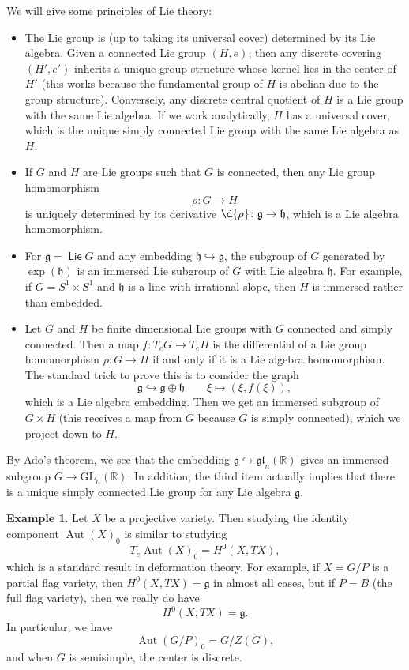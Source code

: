 \documentclass{amsart}
\theoremstyle{definition}
\newtheorem{exm}[thm]{Example}
\theoremstyle{remark}
\theoremstyle{plain}
\theoremstyle{definition}
\theoremstyle{remark}
\newcommand{\R}{\mathbb{R}}
\newcommand{\g}{\mathfrak{g}}
\newcommand{\h}{\mathfrak{h}}
\newcommand{\mf}[1]{\mathfrak{#1}}
\newcommand{\mr}[1]{\mathrm{#1}}
\newcommand{\on}[1]{\operatorname{#1}}
\newcommand{\ms}[1]{\mathsf{#1}}
\newcommand{\1}{\mathbf{1}}
\newcommand{\2}{\mathbf{2}}
\newcommand{\3}{\mathbf{3}}
\newcommand{\GL}{\mr{GL}}
\newcommand{\gl}{\mf{gl}}
\DeclareMathOperator{\Aut}{Aut}
\begin{document}
We will give some principles of Lie theory:
\begin{itemize}
    \item The Lie group is (up to taking its universal cover) determined by its Lie algebra. Given a connected Lie group \((H, e)\), then any discrete covering \((H', e')\) inherits a unique group structure whose kernel lies in the center of \(H'\) (this works because the fundamental group of \(H\) is abelian due to the group structure). Conversely, any discrete central quotient of \(H\) is a Lie group with the same Lie algebra. If we work analytically, \(H\) has a universal cover, which is the unique simply connected Lie group with the same Lie algebra as \(H\).
    \item If \(G\) and \(H\) are Lie groups such that \(G\) is connected, then any Lie group homomorphism
    \[ \rho \colon G \to H \]
    is uniquely determined by its derivative \(\d{\rho} \colon \g \to \mf{h}\), which is a Lie algebra homomorphism.
    \item For \(\g = \on{\ms{Lie}} G\) and any embedding \(\mf{h} \hookrightarrow \g\), the subgroup of \(G\) generated by \(\exp(\mf{h})\) is an immersed Lie subgroup of \(G\) with Lie algebra \(\mf{h}\). For example, if \(G = S^1 \times S^1\) and \(\h\) is a line with irrational slope, then \(H\) is immersed rather than embedded.
    \item Let \(G\) and \(H\) be finite dimensional Lie groups with \(G\) connected and simply connected. Then a map \(f \colon T_e G \to T_e H\) is the differential of a Lie group homomorphism \(\rho \colon G \to H\) if and only if it is a Lie algebra homomorphism. The standard trick to prove this is to consider the graph
    \[ \g \hookrightarrow \g \oplus \h \qquad \xi \mapsto (\xi, f(\xi)), \]
    which is a Lie algebra embedding. Then we get an immersed subgroup of \(G \times H\) (this receives a map from \(G\) because \(G\) is simply connected), which we project down to \(H\).
\end{itemize}

By Ado's theorem, we see that the embedding \(\g \hookrightarrow \gl_n(\R)\) gives an immersed subgroup \(G \to \GL_n(\R)\). In addition, the third item actually implies that there is a unique simply connected Lie group for any Lie algebra \(\g\).

\begin{exm}
    Let \(X\) be a projective variety. Then studying the identity component \(\Aut(X)_{0}\) is similar to studying
    \[ T_e \Aut(X)_{0} = H^0(X, TX), \]
    which is a standard result in deformation theory. For example, if \(X = G/P\) is a partial flag variety, then \(H^0(X, TX) = \g\) in almost all cases, but if \(P=B\) (the full flag variety), then we really do have
    \[ H^0(X, TX) = \g. \]
    In particular, we have
    \[ \Aut(G/P)_{0} = G/Z(G), \]
    and when \(G\) is semisimple, the center is discrete.
\end{exm}
\end{document}
